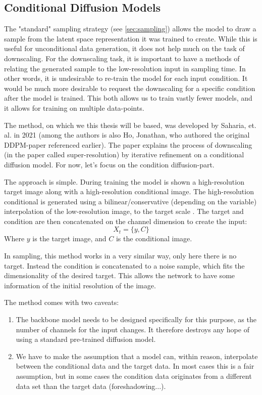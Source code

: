 \subsection{Conditional Diffusion Models} \label{sec:conditioning}

The "standard" sampling strategy (see \autoref{sec:sampling}) allows the model to draw a sample from the latent space representation it was trained to create. While this is useful for unconditional data generation, it does not help much on the task of \gls{downscaling}. For the \gls{downscaling} task, it is important to have a methods of relating the generated sample to the low-resolution input in sampling time. In other words, it is undesirable to re-train the model for each input condition. It would be much more desirable to request the \gls{downscaling} for a specific condition after the model is trained. This both allows us to train vastly fewer models, and it allows for training on multiple data-points.

The method, on which we this thesis will be based, was developed by Saharia, et. al. \cite{sr-diffusion} in 2021 (among the authors is also Ho, Jonathan, who authored the original DDPM-paper referenced earlier). The paper explains the process of \gls{downscaling} (in the paper called super-resolution) by iterative refinement on a conditional diffusion model. For now, let's focus on the condition diffusion-part. 

The approach is simple. During training the model is shown a high-resolution target image along with a high-resolution conditional image. The high-resolution conditional is generated using a bilinear/conservative (depending on the variable) interpolation of the low-resolution image, to the target scale \cite{sr-diffusion}. The target and condition are then concatenated on the channel dimension to create the input:
\begin{equation}
    X_t = \{ y, C \}
\end{equation}
Where $y$ is the target image, and $C$ is the conditional image.

In sampling, this method works in a very similar way, only here there is no target. Instead the condition is concatenated to a noise sample, which fits the dimensionality of the desired target. This allows the network to have some information of the initial resolution of the image.

The method comes with two caveats:
\begin{enumerate}
    \item The backbone model needs to be designed specifically for this purpose, as the number of channels for the input changes. It therefore destroys any hope of using a standard pre-trained diffusion model.
    \item We have to make the assumption that a model can, within reason, interpolate between the conditional data and the target data. In most cases this is a fair assumption, but in some cases the condition data originates from a different data set than the target data (foreshadowing...).
\end{enumerate}

